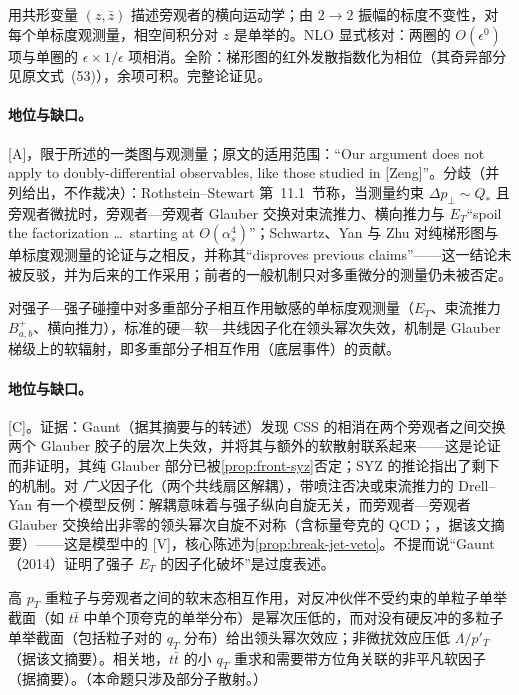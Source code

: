 \begin{proofsketch}
用共形变量 $(z,\bar z)$ 描述旁观者的横向运动学；由 $2\to2$ 振幅的标度不变性，对每个单标度观测量，相空间积分对 $z$ 是单举的。NLO 显式核对：两圈的 $O(\epsilon^0)$ 项与单圈的 $\epsilon\times1/\epsilon$ 项相消。全阶：梯形图的红外发散指数化为相位（其奇异部分见原文式~(53)），余项可积。完整论证见\cite{Schwartz:2018obd}。
\end{proofsketch}

\paragraph{地位与缺口。}[A]，限于所述的一类图与观测量；原文的适用范围：“Our argument does not apply to doubly-differential observables, like those studied in [Zeng]”。分歧（并列给出，不作裁决）：Rothstein--Stewart 第~11.1~节称，当测量约束 $\Delta p_\perp\sim Q_*$ 且旁观者微扰时，旁观者—旁观者 Glauber 交换对束流推力、横向推力与 $E_T$“spoil the factorization \dots\ starting at $O(\alpha_s^4)$”；Schwartz、Yan 与 Zhu 对纯梯形图与单标度观测量的论证与之相反，并称其“disproves previous claims”——这一结论未被反驳，并为后来的工作采用；前者的一般机制只对多重微分的测量仍未被否定。

\begin{conjecture}\label{conj:front-mpi-violation}
对强子—强子碰撞中对多重部分子相互作用敏感的单标度观测量（$E_T$、束流推力 $B^+_{a,b}$、横向推力），标准的硬—软—共线因子化在领头幂次失效，机制是 Glauber 梯级上的软辐射，即多重部分子相互作用（底层事件）的贡献。
\end{conjecture}

\paragraph{地位与缺口。}[C]。证据：Gaunt\cite{Gaunt2014}（据其摘要与\cite{Schwartz:2018obd}的转述）发现 CSS 的相消在两个旁观者之间交换两个 Glauber 胶子的层次上失效，并将其与额外的软散射联系起来——这是论证而非证明，其纯 Glauber 部分已被\cref{prop:front-syz}否定；SYZ 的推论指出了剩下的机制。对 \emph{广义}因子化（两个共线扇区解耦），带喷注否决或束流推力的 Drell--Yan 有一个模型反例：解耦意味着与强子纵向自旋无关，而旁观者—旁观者 Glauber 交换给出非零的领头幂次自旋不对称（含标量夸克的 QCD；\cite{Zeng:2015iba}，据该文摘要）——这是模型中的 [V]，核心陈述为\cref{prop:break-jet-veto}。不提\cite{Schwartz:2018obd}而说“Gaunt（2014）证明了强子 $E_T$ 的因子化破坏”是过度表述。

\begin{proposition}\label{prop:front-heavy-fsi}
高 $p_T$ 重粒子与旁观者之间的软末态相互作用，对反冲伙伴不受约束的单粒子单举截面（如 $t\bar t$ 中单个顶夸克的单举分布）是幂次压低的，而对没有硬反冲的多粒子单举截面（包括粒子对的 $q_T$ 分布）给出领头幂次效应；非微扰效应压低 $\Lambda/p'_T$\cite{Mitov:2012gt}（据该文摘要）。相关地，$t\bar t$ 的小 $q_T$ 重求和需要带方位角关联的非平凡软因子\cite{Catani:2014qha}（据摘要）。（本命题只涉及部分子散射。）
\end{proposition}


